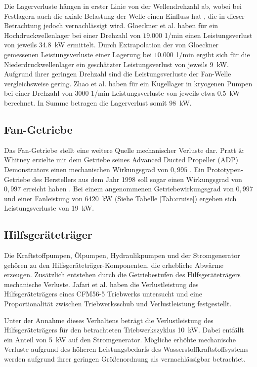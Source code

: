 Die Lagerverluste hängen in erster Linie von der Wellendrehzahl ab, wobei bei Festlagern auch die axiale Belastung der Welle einen Einfluss hat \cite{Zhao.2023}, die in dieser Betrachtung jedoch vernachlässigt wird. Gloeckner et al. \cite{Gloeckner.2017} haben für ein Hochdruckwellenlager bei einer Drehzahl von $19.000$ 1/min einen Leistungsverlust von jeweils \SI{34.8}{\kilo\W} ermittelt. Durch Extrapolation der von Gloeckner \cite{Gloeckner.2013} gemessenen Leistungsverluste einer Lagerung bei $10.000$ 1/min ergibt sich für die Niederdruckwellenlager ein geschätzter Leistungsverlust von jeweils \SI{9}{\kilo\W}. Aufgrund ihrer geringen Drehzahl sind die Leistungsverluste der Fan-Welle vergleichsweise gering. Zhao et al. \cite{Zhao.2023} haben für ein Kugellager in kryogenen Pumpen bei einer Drehzahl von $3000$ 1/min Leistungsverluste von jeweils etwa \SI{0.5}{\kilo\W} berechnet. In Summe betragen die Lagerverlust somit \SI{98}{\kilo\W}.

\subsection{Fan-Getriebe}

Das Fan-Getriebe stellt eine weitere Quelle mechanischer Verluste dar. Pratt \& Whitney erzielte mit dem Getriebe seines Advanced Ducted Propeller (ADP) Demonstrators einen mechanischen Wirkungsgrad von $0,995$ \cite{MCCUNE.1993}. Ein Prototypen-Getriebe des Herstellers aus dem Jahr 1998 soll sogar einen Wirkungsgrad von $0,997$ erreicht haben \cite{anonymous.1998}. Bei einem angenommenen Getriebewirkungsgrad von $0,997$ und einer Fanleistung von \SI{6420}{\kilo\W} (Siehe Tabelle \ref{Tab:cruise}) ergeben sich Leistungsverluste von \SI{19}{\kilo\W}.

\subsection{Hilfsgeräteträger}

Die Kraftstoffpumpen, Ölpumpen, Hydraulikpumpen und der Stromgenerator gehören zu den Hilfsgeräteträger-Komponenten, die erhebliche Abwärme erzeugen. Zusätzlich entstehen durch die Getriebestufen des Hilfsgeräteträgers mechanische Verluste. Jafari et al. \cite{Jafari.2020} haben die Verlustleistung des Hilfsgeräteträgers eines CFM56-5 Triebwerks untersucht und eine Proportionalität zwischen Triebwerksschub und Verlustleistung festgestellt. 

Unter der Annahme dieses Verhaltens beträgt die Verlustleistung des Hilfsgeräteträgers für den betrachteten Triebwerkszyklus \SI{10}{\kilo\W}. Dabei entfällt ein Anteil von \SI{5}{\kilo\W} auf den Stromgenerator. Mögliche erhöhte mechanische Verluste aufgrund des höheren Leistungsbedarfs des Wasserstoffkraftstoffsystems werden aufgrund ihrer geringen Größenordnung als vernachlässigbar betrachtet. 


